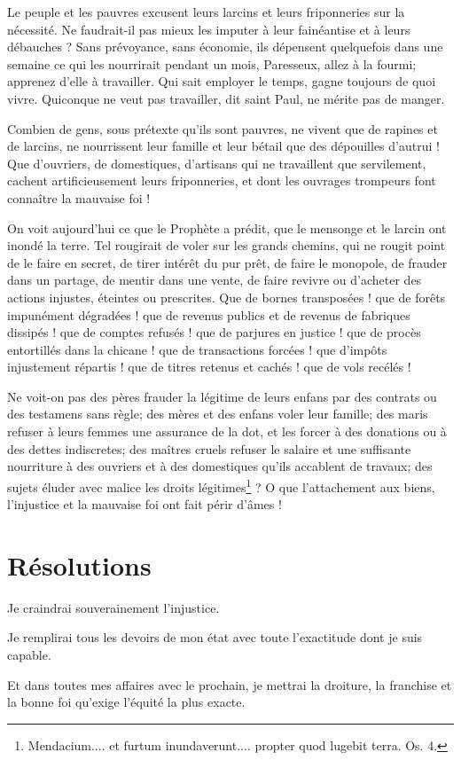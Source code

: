 \documentclass[instructions.tex]{subfiles}
\begin{document}
\secundo Le peuple et les pauvres excusent leurs larcins et leurs friponneries sur la nécessité. Ne faudrait-il pas mieux les imputer à leur fainéantise et à leurs débauches ? Sans prévoyance, sans économie, ils dépensent quelquefois dans une semaine ce qui les nourrirait pendant un mois, Paresseux, allez à la fourmi; apprenez d’elle à travailler. Qui sait employer le temps, gagne toujours de quoi vivre. Quiconque ne veut pas travailler, dit saint Paul, ne mérite pas de manger.
 
Combien de gens, sous prétexte qu’ils sont pauvres, ne vivent que de rapines et de larcins, ne nourrissent leur famille et leur bétail que des dépouilles d’autrui ! Que d’ouvriers, de domestiques, d’artisans qui ne travaillent que servilement, cachent artificieusement leurs friponneries, et dont les ouvrages trompeurs font connaître la mauvaise foi !
 
On voit aujourd’hui ce que le Prophète a prédit, que le mensonge et le larcin ont inondé la terre. Tel rougirait de voler sur les grands chemins, qui ne rougit point de le faire en secret, de tirer intérêt du pur prêt, de faire le monopole, de frauder dans un partage, de mentir dans une vente, de faire revivre ou d’acheter des actions injustes, éteintes ou prescrites. Que de bornes transposées ! que de forêts impunément dégradées ! que de revenus publics et de revenus de fabriques dissipés ! que de comptes refusés ! que de parjures en justice ! que de procès entortillés dans la chicane ! que de transactions forcées ! que d’impôts injustement répartis ! que de titres retenus et cachés ! que de vols recélés !
 
Ne voit-on pas des pères frauder la légitime de leurs enfans par des contrats ou des testamens sans règle; des mères et des enfans voler leur famille; des maris refuser à leurs femmes une assurance de la dot, et les forcer à des donations ou à des dettes indiscretes; des maîtres cruels refuser le salaire et une suffisante nourriture à des ouvriers et à des domestiques qu’ils accablent de travaux; des sujets éluder avec malice les droits légitimes\footnote{Mendacium.... et furtum inundaverunt.... propter quod lugebit terra. Os. 4.} ? O que l’attachement aux biens, l’injustice et la mauvaise foi ont fait périr d’âmes !
 
\section{Résolutions}
 
\primo Je craindrai souverainement l’injustice. 

\secundo Je remplirai tous les devoirs de mon état avec toute l’exactitude dont je suis capable.

\tertio Et dans toutes mes affaires avec le prochain, je mettrai la droiture, la franchise et la bonne foi qu’exige l’équité la plus exacte. 

 
\end{document}
